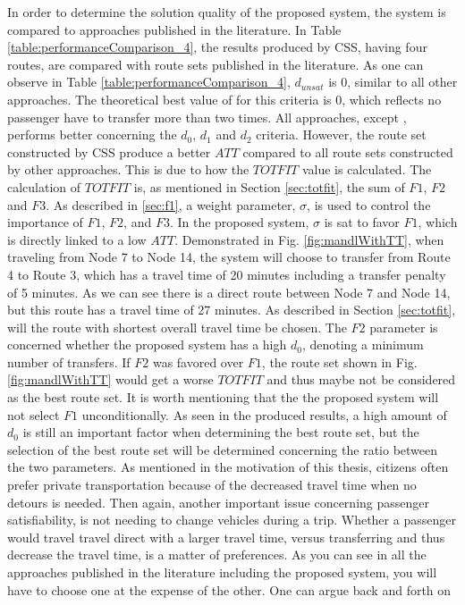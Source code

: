 
In order to determine the solution quality of the proposed system, the system is compared to approaches published in the literature. In Table \vref{table:performanceComparison_4}, the results produced by CSS, having four routes, are compared with route sets published in the literature. As one can observe in Table \vref{table:performanceComparison_4},  $d_{unsat}$ is 0, similar to all other approaches. The theoretical best value of for this criteria is 0, which reflects no passenger have to transfer more than two times. All approaches, except \citep{mandl79, kidwai98, chakroborty02}, performs better concerning the $d_0$, $d_1$ and $d_2$ criteria. However, the route set constructed by CSS produce a better $ATT$ compared to all route sets constructed by  other approaches. This is due to how the $TOTFIT$ value is calculated. The calculation of $TOTFIT$ is, as mentioned in Section \vref{sec:totfit}, the sum of $F1$, $F2$ and $F3$. As described in \vref{sec:f1}, a weight parameter, $\sigma$, is used to control the importance of $F1$, $F2$, and $F3$. In the proposed system, $\sigma$ is sat to favor $F1$, which is directly linked to a low $ATT$. Demonstrated in Fig. \vref{fig:mandlWithTT}, when traveling from Node 7 to Node 14, the system will choose to transfer from Route 4 to Route 3, which has a travel time of 20 minutes including a transfer penalty of 5 minutes. As we can see there is a direct route between Node 7 and Node 14, but this route has a travel time of 27 minutes. As described in Section \vref{sec:totfit}, will the route with shortest overall travel time be chosen. The $F2$ parameter is concerned whether the proposed system has a high $d_0$, denoting a minimum number of transfers. If $F2$ was favored over $F1$, the route set shown in Fig. \vref{fig:mandlWithTT} would get a worse $TOTFIT$ and thus maybe not be considered as the best route set. It is worth mentioning that the the proposed system will not select $F1$ unconditionally. As seen in the produced results, a high amount of $d_0$ is still an important factor when determining the best route set, but the selection of the best route set will be determined concerning the ratio between the two parameters. As mentioned in the motivation of this thesis, citizens often prefer private transportation because of the decreased travel time when no detours is needed. Then again, another important issue concerning passenger satisfiability, is not needing to change vehicles during a trip. Whether a passenger would travel travel direct with a larger travel time, versus transferring and thus decrease the travel time, is a matter of preferences. As you can see in all the approaches published in the literature including the proposed system, you will have to choose one at the expense of the other. One can argue back and forth on 